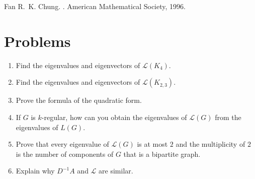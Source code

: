 \documentclass{article}
\theoremstyle{definition}
\begin{document}
\begin{thebibliography}{9}
Fan R.~K. Chung.
.
\newblock American Mathematical Society, 1996.
\end{thebibliography}

\section*{Problems}
\begin{enumerate}
\setlength\itemsep{2em}
\item Find the eigenvalues and eigenvectors of $\mathcal{L}(K_4)$.
\item Find the eigenvalues and eigenvectors of $\mathcal{L}(K_{2,3})$.
\item Prove the formula of the quadratic form.  
\item If $G$ is $k$-regular, how can you obtain the eigenvalues of $\mathcal{L}(G)$ from the eigenvalues of $L(G)$.  
\item Prove that every eigenvalue of $\mathcal{L}(G)$ is at most $2$ and the multiplicity of $2$ is the number of components of $G$ that is a bipartite graph.
\item Explain why $D^{-1}A$ and $\mathcal{L}$ are similar.
\end{enumerate}

\end{document}
